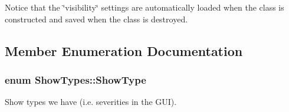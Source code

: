 Notice that the \char`\"{}visibility\char`\"{} settings are automatically loaded when the class is constructed and saved when the class is destroyed. 

\subsection{Member Enumeration Documentation}
\hypertarget{class_show_types_a92c368f2a33741268265ac2d931eae3f}{
\subsubsection[{Show\-Type}]{\setlength{\rightskip}{0pt plus 5cm}enum {\bf Show\-Types\-::\-Show\-Type}}}\label{class_show_types_a92c368f2a33741268265ac2d931eae3f}


Show types we have (i.\-e. severities in the G\-U\-I). 

